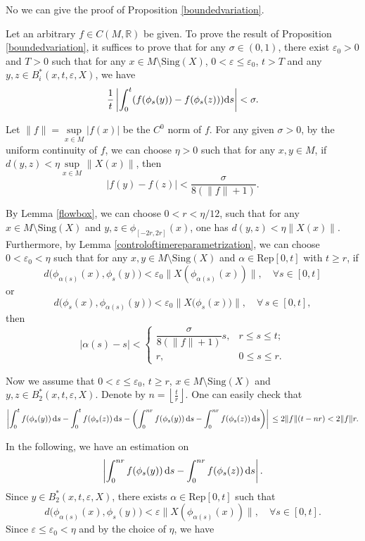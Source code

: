 \documentclass[10pt]{article}
\newtheorem*{Theorem A}{Theorem A}
\begin{document}
No we can give the proof of Proposition \ref{boundedvariation}.

\bigskip

Let an arbitrary $f\in C(M, \mathbb{R})$ be given. To prove the result of Proposition \ref{boundedvariation}, it suffices to prove that for any \(\sigma\in(0, 1)\), there exist \(\varepsilon_0 > 0\) and \(T > 0\) such that
for any \(x \in M \setminus \text{Sing}(X)\), \(0 < \varepsilon \leq \varepsilon_0\), \(t > T\) and any \(y,z \in B_{i}^*(x,t,\varepsilon,X)\), we have
\[
\frac{1}{t} \left| \int_0^t ( f(\phi_s(y)) - f(\phi_s(z))){\rm d}s \right| < \sigma.
\]

Let \(\| f \| = \sup\limits_{x \in M} |f(x)|\) be the $C^0$ norm of $f$. For any given \(\sigma > 0\), by the uniform continuity of \(f\), we can choose \(\eta > 0\) such that for any \(x,y \in M\), if \(d(y,z) < \eta  \sup\limits_{x \in M} \| X(x) \|\), then
\[
|f(y) - f(z)| < \frac{\sigma}{8(\| f \| + 1)}.
\]

By Lemma \ref{flowbox}, we can choose \(0 < r < {\eta}/{12}\), such that for any \(x \in M \setminus \text{Sing}(X)\) and \(y,z \in \phi_{[-2r,2r]}(x)\), one has \(d(y,z) < \eta \| X(x) \|\). Furthermore, by Lemma \ref{controloftimereparametrization}, we can choose \(0 < \varepsilon_0 < \eta\) such that for any \(x,y \in M \setminus \text{Sing}(X)\) and \(\alpha \in \text{Rep}[0,t]\) with \(t \geq r\), if
\[
d\bigl( \phi_{\alpha(s)}(x), \phi_s(y) \bigr) < \varepsilon_0 \| X(\phi_{\alpha(s)}(x)) \|, \quad \forall s \in [0,t]
\]
or
\[
d\bigl(\phi_{s}(x), \phi_{\alpha(s)}(y)\bigr) < \varepsilon_0 \| X\bigl(\phi_{s}(x)\bigr) \|,\quad \forall\, s \in [0, t],
\]
then
\[
\left|\alpha(s) - s\right| <
\begin{cases}
\dfrac{\sigma}{8(\|f\| + 1)}  s, & r \leq s \leq t; \\[10pt]
r, &  0 \leq s \leq r.
\end{cases}
\]

Now we assume that \(0 < \varepsilon \leq \varepsilon_0\), \(t \geq r\), \(x \in M \setminus \text{Sing}(X)\) and \(y,z \in B_{2}^*(x,t,\varepsilon,X)\). Denote by \(n = \left\lfloor \frac{t}{r} \right\rfloor\).
One can easily check that
\[
\left| \int_0^t f(\phi_s(y)) \, {\rm d}s - \int_0^t f(\phi_s(z)) \, {\rm d}s - \left( \int_0^{nr} f(\phi_s(y)) \, {\rm d}s - \int_0^{nr} f(\phi_s(z)) \, {\rm d}s \right) \right| \\
\leq 2 \|f \| (t - nr) < 2 \| f\| r.
\]


In the following, we have an estimation on
\[
\left| \int_0^{nr} f(\phi_s(y)) \, {\rm d}s - \int_0^{nr} f(\phi_s(z)) \, {\rm d}s \right|.
\]
\noindent
Since \( y \in B_2^*(x,t,\varepsilon,X) \), there exists \( \alpha \in \text{Rep}[0,t] \) such that
\[
d\bigl( \phi_{\alpha(s)}(x), \phi_s(y) \bigr) < \varepsilon \| X(\phi_{\alpha(s)}(x)) \|, \quad \forall s\in [0,t].
\]
\noindent
Since \( \varepsilon \leq \varepsilon_0 < \eta \) and by the choice of \( \eta \), we have
\end{document}
